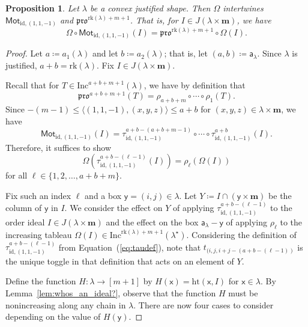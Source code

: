 \documentclass[12pt]{amsart}
\newcommand{\x}{\ensuremath{\mathsf{x}}}
\newcommand{\y}{\ensuremath{\mathsf{y}}}
\newcommand{\aaa}{\ensuremath{\mathsf{a}}}
\newtheorem{proposition}[theorem]{Proposition}
\theoremstyle{definition}
\theoremstyle{remark}
\numberwithin{equation}{section}
\newcommand{\inc}{\ensuremath{\mathrm{Inc}}}
\newcommand{\pro}{\mathfrak{pro}}
\newcommand{\rank}{\ensuremath{\mathrm{rk}}}
\newcommand{\mot}{\ensuremath{\mathsf{Mot}}}
\begin{document}
\begin{proposition}\label{prop:equivariant}
Let $\lambda$ be a convex justified shape. Then $\Omega$ intertwines $\mot_{\mathrm{id},(1,1,-1)}$ and $\pro^{\rank(\lambda)+m+1}$. That is, for $I \in J(\lambda \times \mathbf{m})$, we have \[
\Omega \circ \mot_{\mathrm{id},(1,1,-1)}(I) = \pro^{\rank(\lambda)+m+1} \circ \Omega(I).
\]
\end{proposition}
\begin{proof}
Let $a \coloneqq a_1(\lambda)$ and let $b \coloneqq a_2(\lambda)$; that is, let $(a,b) \coloneqq \aaa_{\lambda}$. Since $\lambda$ is justified, $a+b = \rank(\lambda)$.  Fix $I \in J(\lambda \times \mathbf{m})$. 

Recall that for $T \in \inc^{a+b+m+1}(\lambda)$, we have by definition that
\begin{equation*}
\pro^{a+b+m+1}(T) = \rho_{a+b+m} \circ  \cdots \circ \rho_1(T).
\end{equation*}
Since $-(m-1) \leq \langle (1,1,-1),(x,y,z) \rangle \leq a+b$ for $(x,y,z) \in \lambda \times \mathbf{m}$, we have
\begin{equation*}
\mot_{\mathrm{id},(1,1,-1)}(I) = \tau^{a+b-(a+b+m-1)}_{\mathrm{id},(1,1,-1)} \circ \cdots \circ \tau^{a+b}_{\mathrm{id},(1,1,-1)}(I).
\end{equation*}
Therefore, it suffices to show 
\begin{equation*}
\Omega \left(\tau^{a+b-(\ell-1)}_{\mathrm{id},(1,1,-1)}(I) \right) = \rho_\ell \left(\Omega(I)\right)
\end{equation*}
for all $\ell \in \{1, 2, \dots, a+b+m\}$. 

Fix such an index $\ell$ and a box $\y = (i,j) \in \lambda$. Let $Y \coloneqq I \cap ( \y \times \mathbf{m} )$ be the column of $\y$ in $I$. We consider the effect on $Y$ of applying $\tau^{a+b-(\ell-1)}_{\mathrm{id},(1,1,-1)}$ to the order ideal $I \in J(\lambda \times \mathbf{m})$ and the effect on the box $\aaa_\lambda - \y$ of applying $\rho_\ell$ to the increasing tableau $\Omega(I) \in \inc^{\rank(\lambda) + m + 1}(\lambda^{\star})$. Considering the definition of $\tau^{a+b-(\ell-1)}_{\mathrm{id},(1,1,-1)}$ from Equation~(\ref{eq:taudef}), note that $t_{(i,j,i+j-(a+b-(\ell-1))}$ is the unique toggle in that definition that acts on an element of $Y$.

Define the function $H : \lambda \to [m+1]$ by $H(\x) = \mathrm{ht}(\x,I)$ for $\x \in \lambda$.
By Lemma~\ref{lem:whos_an_ideal?}, observe that the function $H$ must be nonincreasing along any chain in $\lambda$. 
There are now four cases to consider depending on the value of $H(\y)$.


\end{proof}
\end{document}
